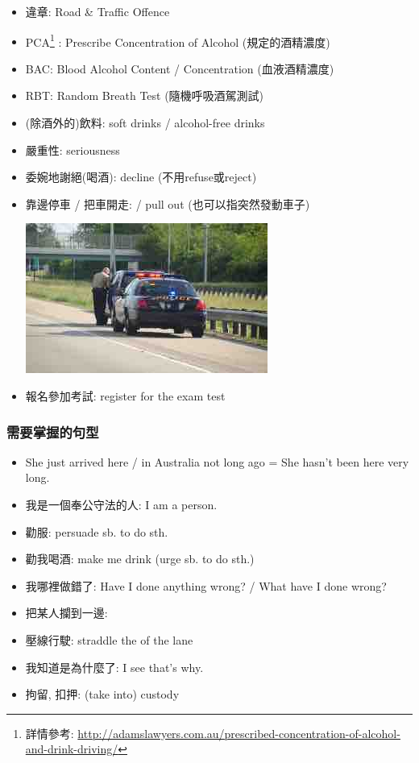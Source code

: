 \begin{itemize}
  \item 違章: Road \& Traffic Offence
  \item PCA\footnote{詳情參考: \url{http://adamslawyers.com.au/prescribed-concentration-of-alcohol-and-drink-driving/}} : Prescribe Concentration of Alcohol (規定的酒精濃度)
  \item BAC: Blood Alcohol Content / Concentration (血液酒精濃度)
  \item RBT: Random Breath Test (隨機呼吸酒駕測試)
  \item (除酒外的)飲料: soft drinks / alcohol-free drinks
  \item 嚴重性: seriousness
  \item 委婉地謝絕(喝酒): decline (不用refuse或reject)
  \item 靠邊停車 / 把車開走:   / pull out (也可以指突然發動車子)
  \begin{center}
    \includegraphics[scale=.7]{pics/pull-over}
  \end{center}
  \item 報名參加考試: register for the exam test
\end{itemize}

\subsubsection*{需要掌握的句型}
\begin{itemize}
  \itemsep0em
  \item She just arrived here / in Australia not long ago = She hasn’t been here very long.
  \item 我是一個奉公守法的人: I am a  person.
  \item 勸服: persuade sb. to do sth.
  \item 勸我喝酒: make me drink (urge sb. to do sth.)
  \item 我哪裡做錯了: Have I done anything wrong? / What have I done wrong?
  \item 把某人攔到一邊: 
  \item 壓線行駛: straddle the  of the lane
  \item 我知道是為什麼了: I see that’s why.
  \item 拘留, 扣押: (take into) custody
\end{itemize}

